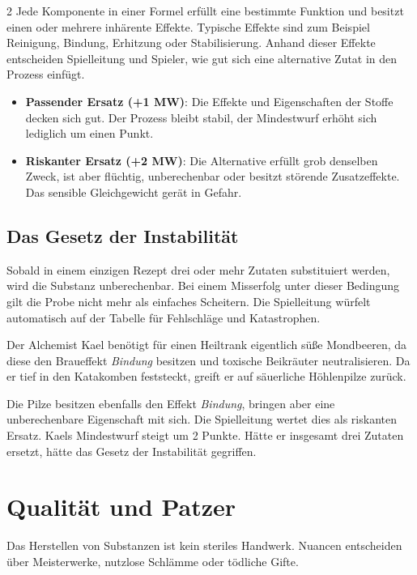 \begin{multicols}{2}
Jede Komponente in einer Formel erfüllt eine bestimmte Funktion und besitzt einen oder mehrere inhärente Effekte. Typische Effekte sind zum Beispiel Reinigung, Bindung, Erhitzung oder Stabilisierung. Anhand dieser Effekte entscheiden Spielleitung und Spieler, wie gut sich eine alternative Zutat in den Prozess einfügt.

\begin{itemize}
    \item \textbf{Passender Ersatz (+1 MW)}: Die Effekte und Eigenschaften der Stoffe decken sich gut. Der Prozess bleibt stabil, der Mindestwurf erhöht sich lediglich um einen Punkt.
    \item \textbf{Riskanter Ersatz (+2 MW)}: Die Alternative erfüllt grob denselben Zweck, ist aber flüchtig, unberechenbar oder besitzt störende Zusatzeffekte. Das sensible Gleichgewicht gerät in Gefahr.
\end{itemize}

\subsection{Das Gesetz der Instabilität}

Sobald in einem einzigen Rezept drei oder mehr Zutaten substituiert werden, wird die Substanz unberechenbar. Bei einem Misserfolg unter dieser Bedingung gilt die Probe nicht mehr als einfaches Scheitern. Die Spielleitung würfelt automatisch auf der Tabelle für Fehlschläge und Katastrophen.

\begin{pexample}[Beispiel]
Der Alchemist Kael benötigt für einen Heiltrank eigentlich süße Mondbeeren, da diese den Braueffekt \textit{Bindung} besitzen und toxische Beikräuter neutralisieren. Da er tief in den Katakomben feststeckt, greift er auf säuerliche Höhlenpilze zurück.

Die Pilze besitzen ebenfalls den Effekt \textit{Bindung}, bringen aber eine unberechenbare Eigenschaft mit sich. Die Spielleitung wertet dies als riskanten Ersatz. Kaels Mindestwurf steigt um 2 Punkte. Hätte er insgesamt drei Zutaten ersetzt, hätte das Gesetz der Instabilität gegriffen.
\end{pexample}

\section{Qualität und Patzer}

Das Herstellen von Substanzen ist kein steriles Handwerk. Nuancen entscheiden über Meisterwerke, nutzlose Schlämme oder tödliche Gifte.


\end{multicols}
